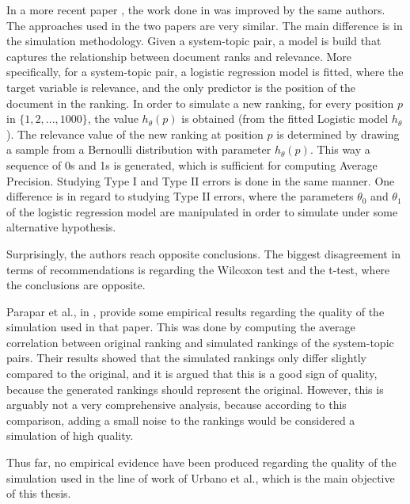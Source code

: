 In a more recent paper \cite{Parapar2021}, the work done in \cite{Parapar2020} was improved by the same authors. The approaches used in the two papers are very similar. The main difference is in the simulation methodology. Given a system-topic pair, a model is build that captures the relationship between document ranks and relevance. More specifically, for a system-topic pair, a logistic regression model is fitted, where the target variable is relevance, and the only predictor is the position of the document in the ranking. In order to simulate a new ranking, for every position $p$ in ${\{1, 2, ..., 1000\}}$, the value $h_\theta(p)$ is obtained (from the fitted Logistic model $h_\theta$). The relevance value of the new ranking at position $p$ is determined by drawing a sample from a Bernoulli distribution with parameter $h_\theta(p)$. This way a sequence of 0s and 1s is generated, which is sufficient for computing Average Precision. Studying Type I and Type II errors is done in the same manner. One difference is in regard to studying Type II errors, where the parameters $\theta_0$ and $\theta_1$ of the logistic regression model are manipulated in order to simulate under some alternative hypothesis. 

Surprisingly, the authors reach opposite conclusions. The biggest disagreement in terms of recommendations is regarding the Wilcoxon test and the t-test, where the conclusions are opposite. 

Parapar et al., in \cite{Parapar2021}, provide some empirical results regarding the quality of the simulation used in that paper. This was done by computing the average correlation between original ranking and simulated rankings of the system-topic pairs. Their results showed that the simulated rankings only differ slightly compared to the original, and it is argued that this is a good sign of quality, because the generated rankings should represent the original. However, this is arguably not a very comprehensive analysis, because according to this comparison, adding a small noise to the rankings would be considered a simulation of high quality.

Thus far, no empirical evidence have been produced regarding the quality of the simulation used in the line of work of Urbano et al., which is the main objective of this thesis.
